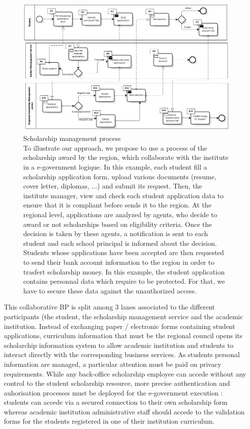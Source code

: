 \documentclass[runningheads,a4paper]{llncs}
\begin{document}
\begin{figure}[ht!]
\centering
\includegraphics[height=200pt, width=320pt]{scholarshipBP.png}
\caption[Scholarship management process]{Scholarship management process\\ To illustrate our approach, we propose to use a process of the scholarship award by the region, which collaborate with the institute in a e-government logique. In this example, each student fill a scholarship application form, upload various documents (resume, cover letter, diplomas, ...) and submit its request. Then, the institute manager, view and check each student application data to ensure that it is compliant before sends it to the region. At the regional level, applications are analyzed by agents, who decide to award or not scholarships based on eligibility criteria. Once the decision is taken by these agents, a notification is sent to each student and each school principal is informed about the decision. Students whose applications have been accepted are then requested to send their bank account information to the region in order to trasfert scholarship money.
In this example, the student application contains personnal data which require to be protected. For that, we have to secure these data against the unauthorized access.}
\label{fig:bp}
\end{figure}

 
This collaborative BP is split among 3 lanes associated to the different participants (the student, the scholarship management service and the academic institution. Instead of exchanging paper / electronic forms containing student applications, curriculum information that must be the regional council opens its scholarchip information system to allow academic institution and students to interact directly with the corresponding business services. As students personal information are managed, a particular attention must be paid on privacy requirements. While any back-office scholarship employee can accede without any control to the student scholarship resource, more precise authentication and auhorisation processes must be deployed for the e-government execution : students can accede via a secured connection to their own scholarship form whereas academic institution administrative staff should accede to the validation forms for the students registered in one of their institution curriculum.
\end{document}
